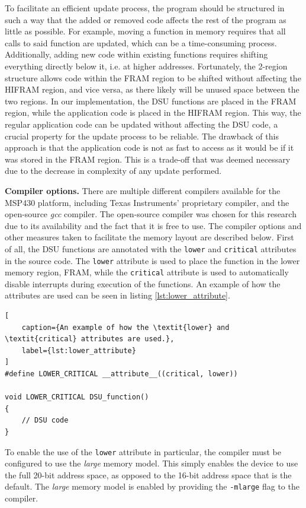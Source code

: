 To facilitate an efficient update process, the program should be structured in such a way that the added or removed code affects the rest of the program as little as possible. For example, moving a function in memory requires that all calls to said function are updated, which can be a time-consuming process. Additionally, adding new code within existing functions requires shifting everything directly below it, i.e. at higher addresses. Fortunately, the 2-region structure allows code within the FRAM region to be shifted without affecting the HIFRAM region, and vice versa, as there likely will be unused space between the two regions. In our implementation, the DSU functions are placed in the FRAM region, while the application code is placed in the HIFRAM region. This way, the regular application code can be updated without affecting the DSU code, a crucial property for the update process to be reliable. The drawback of this approach is that the application code is not as fast to access as it would be if it was stored in the FRAM region. This is a trade-off that was deemed necessary due to the decrease in complexity of any update performed. 

\textbf{Compiler options.} There are multiple different compilers available for the MSP430 platform, including Texas Instruments' proprietary compiler, and the open-source \textit{gcc} compiler. The open-source compiler was chosen for this research due to its availability and the fact that it is free to use. The compiler options and other measures taken to facilitate the memory layout are described below.
First of all, the DSU functions are annotated with the \verb|lower| and \verb|critical| attributes in the source code. The \verb|lower| attribute is used to place the function in the lower memory region, FRAM, while the \verb|critical| attribute is used to automatically disable interrupts during execution of the functions. An example of how the attributes are used can be seen in listing \ref{lst:lower_attribute}. 
\newpage
\begin{framed}
\begin{lstlisting}[
    caption={An example of how the \textit{lower} and \textit{critical} attributes are used.},
    label={lst:lower_attribute}
]
#define LOWER_CRITICAL __attribute__((critical, lower))

void LOWER_CRITICAL DSU_function()
{
    // DSU code
}
\end{lstlisting}
\end{framed}
To enable the use of the \verb|lower| attribute in particular, the compiler must be configured to use the \textit{large} memory model. This simply enables the device to use the full 20-bit address space, as opposed to the 16-bit address space that is the default. The \textit{large} memory model is enabled by providing the \verb|-mlarge| flag to the compiler. 

